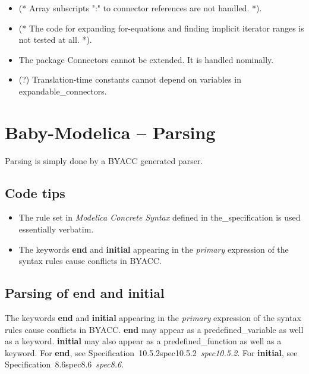 \documentclass[10pt,b5paper]{article}
\def\specrefx#1#2{Specification~#1\ifx\relax#2\relax{}\else~{\it{}#2}\fi}
\def\specref#1{\specrefx{#1}{\csname spec#1\endcsname}}
\begin{document}
\begin{itemize}
\item (* Array subscripts ":" to connector references are not
handled. *).

\item (* The code for expanding for-equations and finding implicit
iterator ranges is not tested at all. *).

\item The package Connectors cannot be extended.  It is handled
nominally.

\item (?) Translation-time constants cannot depend on variables in
expandable_connectors.

\end{itemize}


\section{Baby-Modelica -- Parsing}

{Parsing} is simply done by a BYACC generated parser.


\subsection{Code tips}

\begin{itemize}

\item The rule set in {\it{}Modelica Concrete Syntax\/} defined in
the_specification is used essentially verbatim.

\item The keywords {\bf{}end} and {\bf{}initial} appearing in the
{\it{}primary\/} expression of the syntax rules cause conflicts in
BYACC\@.

\end{itemize}


\subsection{Parsing of {\bf{}end} and {\bf{}initial}}

The keywords {\bf{}end} and {\bf{}initial} appearing in the
{\it{}primary\/} expression of the syntax rules cause conflicts in
BYACC\@.  {\bf{}end} may appear as a predefined_variable as well as a
keyword.  {\bf{}initial} may also appear as a predefined_function as
well as a keyword.  For {\bf{}end}, see \specref{10.5.2}.  For
{\bf{}initial}, see \specref{8.6}.
\end{document}
